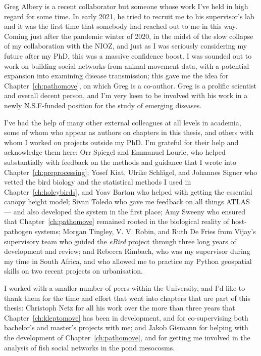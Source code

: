 \noindent Greg Albery is a recent collaborator but someone whose work I've held in high regard for some time.
In early 2021, he tried to recruit me to his supervisor's lab and it was the first time that somebody had reached out to me in this way. 
Coming just after the pandemic winter of 2020, in the midst of the slow collapse of my collaboration with the NIOZ, and just as I was seriously considering my future after my PhD, this was a massive confidence boost.
I was sounded out to work on building social networks from animal movement data, with a potential expansion into examining disease transmission; this gave me the idea for Chapter~\ref{ch:pathomove}, on which Greg is a co-author.
Greg is a prolific scientist and overall decent person, and I'm very keen to be involved with his work in a newly N.S.F-funded position for the study of emerging diseases.

\noindent I've had the help of many other external colleagues at all levels in academia, some of whom who appear as authors on chapters in this thesis, and others with whom I worked on projects outside my PhD.
I'm grateful for their help and acknowledge them here:
Orr Spiegel and Emmanuel Lourie, who helped substantially with feedback on the methods and guidance that I wrote into Chapter~\ref{ch:preprocessing};
Yosef Kiat, Ulrike Schl{\"a}gel, and Johannes Signer who vetted the bird biology and the statistical methods I used in Chapter~\ref{ch:holeybirds}, and Yoav Bartan who helped with getting the essential canopy height model;
Sivan Toledo who gave me feedback on all things ATLAS --- and also developed the system in the first place;
Amy Sweeny who ensured that Chapter~\ref{ch:pathomove} remained rooted in the biological reality of host-pathogen systems;
Morgan Tingley, V. V. Robin, and Ruth De Fries from Vijay's supervisory team who guided the \textit{eBird} project through three long years of development and review;
and Rebecca Rimbach, who was my supervisor during my time in South Africa, and who allowed me to practice my Python geospatial skills on two recent projects on urbanisation.

I worked with a smaller number of peers within the University, and I'd like to thank them for the time and effort that went into chapters that are part of this thesis:
Christoph Netz for all his work over the more than three years that Chapter~\ref{ch:kleptomove} has been in development, and for co-supervising both bachelor's and master's projects with me;
and Jakob Gismann for helping with the development of Chapter~\ref{ch:pathomove}, and for getting me involved in the analysis of fish social networks in the pond mesocosms.

